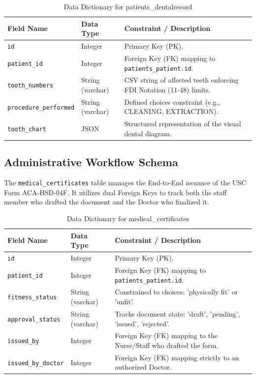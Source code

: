 \begin{table}[htbp]
\centering
\caption{Data Dictionary for patients\_dentalrecord}
\begin{tabular}{|l|l|p{7cm}|}
\hline
\textbf{Field Name} & \textbf{Data Type} & \textbf{Constraint / Description} \\
\hline
\texttt{id} & Integer & Primary Key (PK). \\
\hline
\texttt{patient\_id} & Integer & Foreign Key (FK) mapping to \texttt{patients\_patient.id}. \\
\hline
\texttt{tooth\_numbers} & String (varchar) & CSV string of affected teeth enforcing FDI Notation (11-48) limits. \\
\hline
\texttt{procedure\_performed} & String (varchar) & Defined choices constraint (e.g., CLEANING, EXTRACTION). \\
\hline
\texttt{tooth\_chart} & JSON & Structured representation of the visual dental diagram. \\
\hline
\end{tabular}
\end{table}

\subsection{Administrative Workflow Schema}
The \texttt{medical\_certificates} table manages the End-to-End issuance of the USC Form ACA-HSD-04F. It utilizes dual Foreign Keys to track both the staff member who drafted the document and the Doctor who finalized it.

\begin{table}[htbp]
\centering
\caption{Data Dictionary for medical\_certificates}
\begin{tabular}{|l|l|p{7cm}|}
\hline
\textbf{Field Name} & \textbf{Data Type} & \textbf{Constraint / Description} \\
\hline
\texttt{id} & Integer & Primary Key (PK). \\
\hline
\texttt{patient\_id} & Integer & Foreign Key (FK) mapping to \texttt{patients\_patient.id}. \\
\hline
\texttt{fitness\_status} & String (varchar) & Constrained to choices: 'physically fit' or 'unfit'. \\
\hline
\texttt{approval\_status} & String (varchar) & Tracks document state: 'draft', 'pending', 'issued', 'rejected'. \\
\hline
\texttt{issued\_by} & Integer & Foreign Key (FK) mapping to the Nurse/Staff who drafted the form. \\
\hline
\texttt{issued\_by\_doctor} & Integer & Foreign Key (FK) mapping strictly to an authorized Doctor. \\
\hline
\end{tabular}
\end{table}

